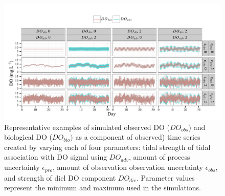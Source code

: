 \documentclass[letterpaper,12pt,oneside]{article}\usepackage[]{graphicx}\usepackage[]{color}
\newenvironment{knitrout}{}{} %
\begin{document}
\centering\vspace*{\fill}
\begin{knitrout}
\color{fgcolor}\begin{figure}[!ht]


{\centering \includegraphics[width=\textwidth]{figure/sim_ex} 

}

\caption[Representative examples of simulated observed \ac{DO} ($DO_{obs}$) and biological \ac{DO} ($DO_{bio})$ as a component of observed) time series created by varying each of four parameters]{Representative examples of simulated observed \ac{DO} ($DO_{obs}$) and biological \ac{DO} ($DO_{bio})$ as a component of observed) time series created by varying each of four parameters: tidal strength of tidal association with \ac{DO} signal using $DO_{adv}$, amount of process uncertainty $\epsilon_{pro}$, amount of observation observation uncertainty $\epsilon_{obs}$, and strength of diel \ac{DO} component $DO_{die}$.  Parameter values represent the minimum and maximum used in the simulations.\label{fig:sim_ex}}
\end{figure}


\end{knitrout}
\vfill
\clearpage
\end{document}
